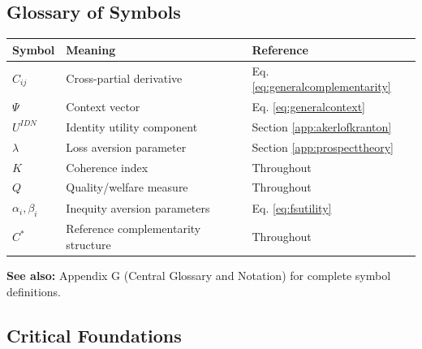 
\subsection{Glossary of Symbols}
\label{sec:A-glossary}

\begin{center}
\begin{tabular}{@{}lll@{}}
\toprule
\textbf{Symbol} & \textbf{Meaning} & \textbf{Reference} \\
\midrule
$C_{ij}$ & Cross-partial derivative & Eq. \ref{eq:generalcomplementarity} \\
$\Psi$ & Context vector & Eq. \ref{eq:generalcontext} \\
$U^{IDN}$ & Identity utility component & Section \ref{app:akerlofkranton} \\
$\lambda$ & Loss aversion parameter & Section \ref{app:prospecttheory} \\
$K$ & Coherence index & Throughout \\
$Q$ & Quality/welfare measure & Throughout \\
$\alpha_i, \beta_i$ & Inequity aversion parameters & Eq. \ref{eq:fsutility} \\
$C^*$ & Reference complementarity structure & Throughout \\
\bottomrule
\end{tabular}
\end{center}

\textbf{See also:} Appendix G (Central Glossary and Notation) for complete symbol definitions.


\subsection{Critical Foundations}
\label{sec:A-foundations}

